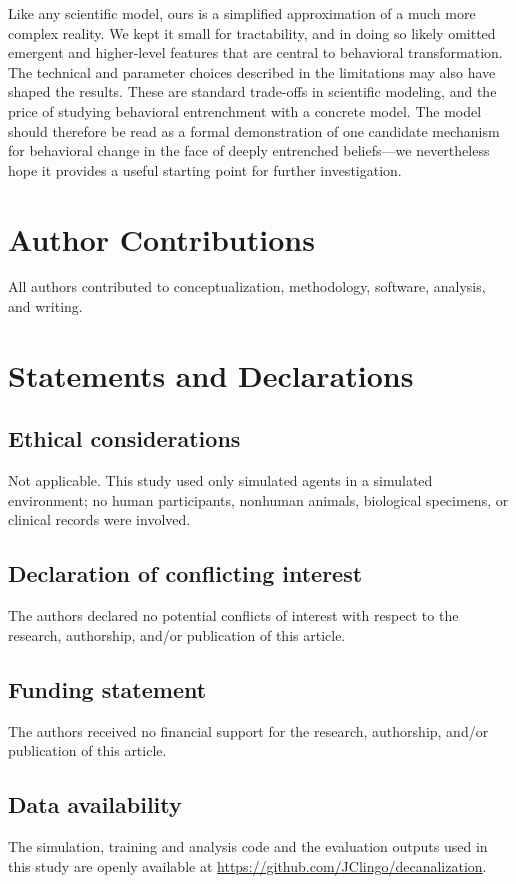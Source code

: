 \documentclass[12pt,fleqn]{article}
\begin{document}
Like any scientific model, ours is a simplified approximation of a much more complex reality. We kept it small for tractability, and in doing so likely omitted emergent and higher-level features that are central to behavioral transformation. The technical and parameter choices described in the limitations may also have shaped the results. These are standard trade-offs in scientific modeling, and the price of studying behavioral entrenchment with a concrete model. The model should therefore be read as a formal demonstration of one candidate mechanism for behavioral change in the face of deeply entrenched beliefs---we nevertheless hope it provides a useful starting point for further investigation.

\section*{Author Contributions}
All authors contributed to conceptualization, methodology, software, analysis, and writing.

\section*{Statements and Declarations}

\subsection*{Ethical considerations}
Not applicable. This study used only simulated agents in a simulated environment; no human participants, nonhuman animals, biological specimens, or clinical records were involved.

\subsection*{Declaration of conflicting interest}
The authors declared no potential conflicts of interest with respect to the research, authorship, and/or publication of this article.

\subsection*{Funding statement}
\begin{sloppypar}
  The authors received no financial support for the research, authorship, and/or publication of this article.
\end{sloppypar}

\subsection*{Data availability}
The simulation, training and analysis code and the evaluation outputs used in this study are openly available at \url{https://github.com/JClingo/decanalization}.
\end{document}
